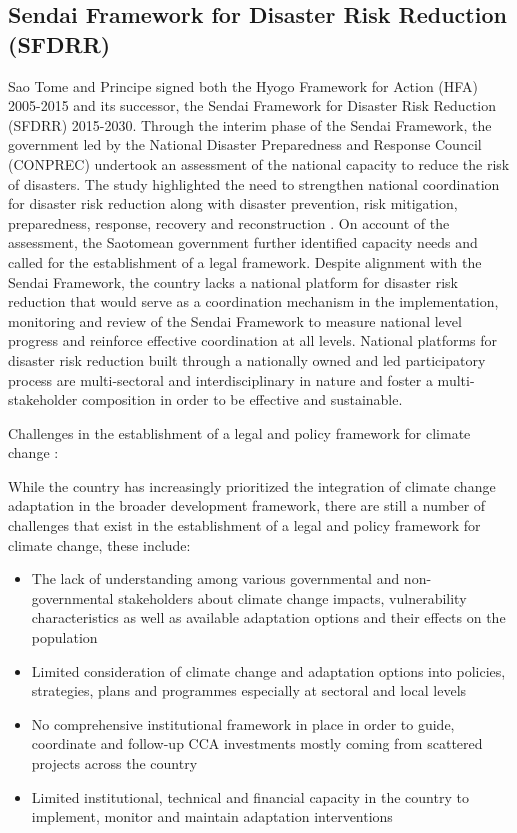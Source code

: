 \documentclass[
]{book}
\providecommand{\tightlist}{%
  \setlength{\itemsep}{0pt}\setlength{\parskip}{0pt}}
\begin{document}
\hypertarget{sendai-framework-for-disaster-risk-reduction-sfdrr-1}{%
\subsection{Sendai Framework for Disaster Risk Reduction (SFDRR)}\label{sendai-framework-for-disaster-risk-reduction-sfdrr-1}}

Sao Tome and Principe signed both the Hyogo Framework for Action (HFA) 2005-2015 and its successor, the Sendai Framework for Disaster Risk Reduction (SFDRR) 2015-2030. Through the interim phase of the Sendai Framework, the government led by the National Disaster Preparedness and Response Council (CONPREC) undertook an assessment of the national capacity to reduce the risk of disasters. The study highlighted the need to strengthen national coordination for disaster risk reduction along with disaster prevention, risk mitigation, preparedness, response, recovery and reconstruction . On account of the assessment, the Saotomean government further identified capacity needs and called for the establishment of a legal framework. Despite alignment with the Sendai Framework, the country lacks a national platform for disaster risk reduction that would serve as a coordination mechanism in the implementation, monitoring and review of the Sendai Framework to measure national level progress and reinforce effective coordination at all levels. National platforms for disaster risk reduction built through a nationally owned and led participatory process are multi-sectoral and interdisciplinary in nature and foster a multi-stakeholder composition in order to be effective and sustainable.

Challenges in the establishment of a legal and policy framework for climate change :

While the country has increasingly prioritized the integration of climate change adaptation in the broader development framework, there are still a number of challenges that exist in the establishment of a legal and policy framework for climate change, these include:

\begin{itemize}
\tightlist
\item
  The lack of understanding among various governmental and non-governmental stakeholders about climate change impacts, vulnerability characteristics as well as available adaptation options and their effects on the population
\item
  Limited consideration of climate change and adaptation options into policies, strategies, plans and programmes especially at sectoral and local levels
\item
  No comprehensive institutional framework in place in order to guide, coordinate and follow-up CCA investments mostly coming from scattered projects across the country
\item
  Limited institutional, technical and financial capacity in the country to implement, monitor and maintain adaptation interventions
\end{itemize}
\end{document}
